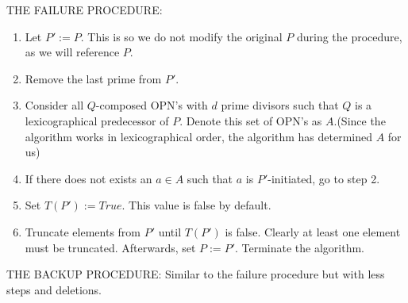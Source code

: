 \documentclass[../paper.tex]{subfiles}
\begin{document}
\noindent{}

THE FAILURE PROCEDURE:

\begin{enumerate}[label*=\arabic*.]

  \item Let $P' := P$. This is so we do not modify the original
        $P$ during the procedure, as we will reference $P$.  

  \item Remove the last prime from $P'$.

  \item \label{fail_loop}
        Consider all $Q$-composed OPN's with $d$ prime divisors
such
        that $Q$ is a lexicographical predecessor of $P$. Denote
        this set of OPN's as $A$.(Since the algorithm works in
        lexicographical order, the algorithm has determined $A$
        for us) 

  \item If there does not exists an $a \in A$ such that $a$ is
    $P'$-initiated, go to step 2.

  \item Set $T(P') := True$. This value is false by default.

  \item Truncate elements from $P'$ until $T(P')$ is false.
        Clearly at least one element must be truncated.
        Afterwards, set $P := P'$. Terminate the algorithm.
\end{enumerate}

THE BACKUP PROCEDURE: Similar to the failure procedure but with
less steps and deletions.
\end{document}
